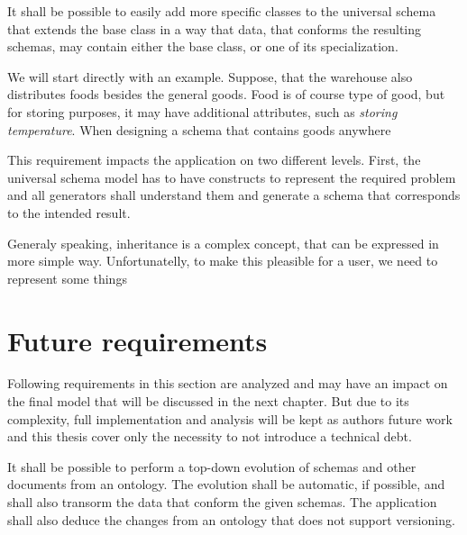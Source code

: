 
\begin{requirement}
    It shall be possible to easily add more specific classes to the universal schema that extends the base class in a way that data, that conforms the resulting schemas, may contain either the base class, or one of its specialization.
\end{requirement}

\begin{showcase}
    We will start directly with an example. Suppose, that the warehouse also distributes foods besides the general goods. Food is of course type of good, but for storing purposes, it may have additional attributes, such as \textit{storing temperature}. When designing a schema that contains goods anywhere


\end{showcase}

This requirement impacts the application on two different levels. First, the universal schema model has to have constructs to represent the required problem and all generators shall understand them and generate a schema that corresponds to the intended result.

Generaly speaking, inheritance is a complex concept, that can be expressed in more simple way. Unfortunatelly, to make this pleasible for a user, we need to represent some things %


\section{Future requirements}

Following requirements in this section are analyzed and may have an impact on the final model that will be discussed in the next chapter. But due to its complexity, full implementation and analysis will be kept as authors future work and this thesis cover only the necessity to not introduce a technical debt.

\begin{requirement}
    It shall be possible to perform a top-down evolution of schemas and other documents from an ontology. The evolution shall be automatic, if possible, and shall also transorm the data that conform the given schemas. The application shall also deduce the changes from an ontology that does not support versioning.
\end{requirement}

